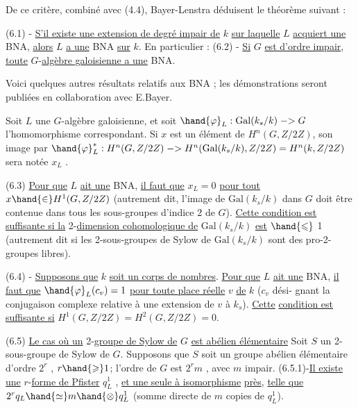
De ce critère, combiné avec (4.4), Bayer-Lenstra déduisent le théorème
suivant :

(6.1) - \uline{S'il existe une extension de degré impair de} $k$ \uline{sur laquelle} $L$
\uline{acquiert une} BNA, \uline{alors} $L$ \uline{a une} BNA \uline{sur} $k$.
En particulier :
(6.2) - \uline{Si} $G$ \uline{est d'ordre impair}, \uline{toute} $G$-\uline{algèbre galoisienne a une} BNA.

Voici quelques autres résultats relatifs aux BNA ; les démonstrations
seront publiées en collaboration avec E.Bayer.

Soit $L$ une $G$-algèbre galoisienne, et soit $\hand{\varphi}_L : \mathrm{Gal}(k_s/k) \;{-}{>}\; G$
l'homomorphisme correspondant. Si $x$ est un élément de $H^n(G, Z/2Z)$,
son image par $\hand{\varphi}_L^{*} : H^n(G, Z/2Z) \;{-}{>}\; H^n(\mathrm{Gal}(k_s/k), Z/2Z) = H^n(k, Z/2Z)$
sera notée $x_L$ .

(6.3) \uline{Pour que} $L$ \uline{ait une} BNA, \uline{il faut que} $x_L = 0$ \uline{pour tout} $x \hand{\in} H^1(G, Z/2Z)$
(autrement dit, l'image de $\mathrm{Gal}(k_s/k)$ dans $G$ doit être contenue dans tous
les sous-groupes d'indice $2$ de $G$). \uline{Cette condition est suffisante si la}
2-\uline{dimension cohomologique de} $\mathrm{Gal}(k_s/k)$ \uline{est} $\hand{\leqslant}$ 1 (autrement dit si les
2-sous-groupes de Sylow de $\mathrm{Gal}(k_s/k)$ sont des pro-2-groupes libres).

(6.4) - \uline{Supposons que} $k$ \uline{soit un corps de nombres}. \uline{Pour que} $L$ \uline{ait une}
BNA, \uline{il faut que} $\hand{\varphi}_L(c_v) = 1$ \uline{pour toute place réelle} $v$ \uline{de} $k$ ($c_v$ dési-%
gnant la conjugaison complexe relative à une extension de $v$ à $k_s$). \uline{Cette}
\uline{condition est suffisante si} $H^1(G, Z/2Z) = H^2(G, Z/2Z) = 0$.

(6.5) \uline{Le cas où un} 2-\uline{groupe de Sylow de} $G$ \uline{est abélien élémentaire}
Soit $S$ un 2-sous-groupe de Sylow de $G$. Supposons que $S$ soit un groupe
abélien élémentaire d'ordre $2^r$ , $r \hand{\geqslant} 1$; l'ordre de $G$ est $2^r m$ , avec $m$
impair.
(6.5.1)-\uline{Il existe une} $r$-\uline{forme de Pfister} $q^1_L$ , \uline{et une seule à isomorphisme}
\uline{près}, \uline{telle que} $2^r q_L \hand{\simeq} m \hand{\otimes} q^1_L$ (somme directe de $m$ copies de $q^1_L$).

